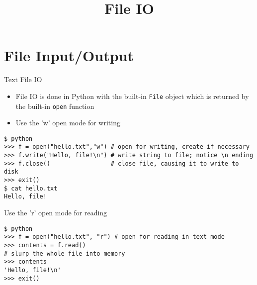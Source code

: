 \documentclass[smaller, aspectratio=1610]{beamer}
\date{}
\title{File IO}
\begin{document}
\maketitle

\section{File Input/Output}
\label{sec:org5c4c663}

\begin{frame}[label={sec:orgd34619c},fragile]{Text File IO}
 \begin{itemize}
\item File IO is done in Python with the built-in \texttt{File} object which is returned by the built-in \texttt{open} function
\item Use the 'w' open mode for writing
\end{itemize}

\lstset{language=Python,label= ,caption= ,captionpos=b,numbers=none}
\begin{lstlisting}
$ python
>>> f = open("hello.txt","w") # open for writing, create if necessary
>>> f.write("Hello, file!\n") # write string to file; notice \n ending
>>> f.close()                 # close file, causing it to write to disk
>>> exit()
$ cat hello.txt
Hello, file!
\end{lstlisting}

Use the ’r’ open mode for reading

\lstset{language=Python,label= ,caption= ,captionpos=b,numbers=none}
\begin{lstlisting}
$ python
>>> f = open("hello.txt", "r") # open for reading in text mode
>>> contents = f.read()
# slurp the whole file into memory
>>> contents
'Hello, file!\n'
>>> exit()
\end{lstlisting}
\end{frame}
\end{document}
